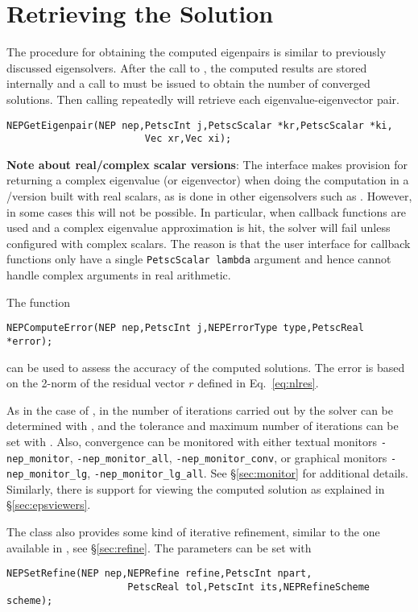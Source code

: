 \section{Retrieving the Solution}

The procedure for obtaining the computed eigenpairs is similar to previously discussed eigensolvers. After the call to , the computed results are stored internally and a call to  must be issued to obtain the number of converged solutions. Then calling  repeatedly will retrieve each eigenvalue-eigenvector pair.

	\begin{Verbatim}[fontsize=\small]
	NEPGetEigenpair(NEP nep,PetscInt j,PetscScalar *kr,PetscScalar *ki,
                        Vec xr,Vec xi);
	\end{Verbatim}

\textbf{Note about real/complex scalar versions}: The interface makes provision for returning a complex eigenvalue (or eigenvector) when doing the computation in a \petsc/\slepc version built with real scalars, as is done in other eigensolvers such as . However, in some cases this will not be possible. In particular, when callback functions are used and a complex eigenvalue approximation is hit, the solver will fail unless configured with complex scalars. The reason is that the user interface for callback functions only have a single \texttt{PetscScalar lambda} argument and hence cannot handle complex arguments in real arithmetic.

\medskip

The function
	\begin{Verbatim}[fontsize=\small]
	NEPComputeError(NEP nep,PetscInt j,NEPErrorType type,PetscReal *error);
	\end{Verbatim}
can be used to assess the accuracy of the computed solutions. The error is based on the 2-norm of the residual vector $r$ defined in Eq.\ \ref{eq:nlres}.

As in the case of , in  the number of iterations carried out by the solver can be determined with , and the tolerance and maximum number of iterations can be set with . Also, convergence can be monitored with either textual monitors \Verb!-nep_monitor!, \Verb!-nep_monitor_all!, \Verb!-nep_monitor_conv!, or graphical monitors \Verb!-nep_monitor_lg!, \Verb!-nep_monitor_lg_all!. See \S\ref{sec:monitor} for additional details. Similarly, there is support for viewing the computed solution as explained in \S\ref{sec:epsviewers}.


The  class also provides some kind of iterative refinement, similar to the one available in , see \S\ref{sec:refine}. The parameters can be set with
	\begin{Verbatim}[fontsize=\small]
	NEPSetRefine(NEP nep,NEPRefine refine,PetscInt npart,
                     PetscReal tol,PetscInt its,NEPRefineScheme scheme);
	\end{Verbatim}


